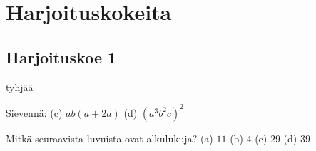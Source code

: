 \chapter{Harjoituskokeita}

\section*{Harjoituskoe 1}

\begin{description}
	\item tyhjää
	\item Sievennä: (c) $ab(a+2a)$ (d) $(a^3 b^2 c)^2$
	\item
	\item Mitkä seuraavista luvuista ovat alkulukuja? (a) $11$ (b) $4$ (c) $29$ (d) $39$
\end{description}
